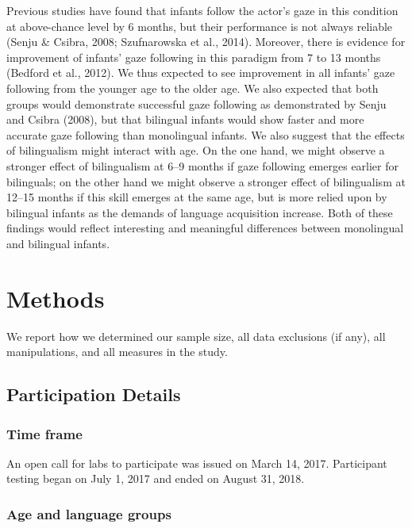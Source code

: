 \documentclass[
  english,
  ,man,floatsintext]{apa6}
\begin{document}
Previous studies have found that infants follow the actor's gaze in this condition at above-chance level by 6 months, but their performance is not always reliable (Senju \& Csibra, 2008; Szufnarowska et al., 2014). Moreover, there is evidence for improvement of infants' gaze following in this paradigm from 7 to 13 months (Bedford et al., 2012). We thus expected to see improvement in all infants' gaze following from the younger age to the older age. We also expected that both groups would demonstrate successful gaze following as demonstrated by Senju and Csibra (2008), but that bilingual infants would show faster and more accurate gaze following than monolingual infants. We also suggest that the effects of bilingualism might interact with age. On the one hand, we might observe a stronger effect of bilingualism at 6--9 months if gaze following emerges earlier for bilinguals; on the other hand we might observe a stronger effect of bilingualism at 12--15 months if this skill emerges at the same age, but is more relied upon by bilingual infants as the demands of language acquisition increase. Both of these findings would reflect interesting and meaningful differences between monolingual and bilingual infants.

\hypertarget{methods}{%
\section{Methods}\label{methods}}

We report how we determined our sample size, all data exclusions (if any), all manipulations, and all measures in the study.

\hypertarget{participation-details}{%
\subsection{Participation Details}\label{participation-details}}

\hypertarget{time-frame}{%
\subsubsection{Time frame}\label{time-frame}}

An open call for labs to participate was issued on March 14, 2017. Participant testing began on July 1, 2017 and ended on August 31, 2018.

\hypertarget{age-and-language-groups}{%
\subsubsection{Age and language groups}\label{age-and-language-groups}}
\end{document}
